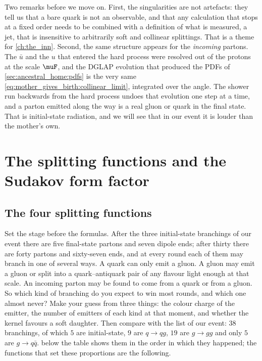 Two remarks before we move on. First, the singularities are not artefacts:
they tell us that a bare quark is not an observable, and that any
calculation that stops at a fixed order needs to be combined with a
definition of what is measured, a jet, that is insensitive to arbitrarily
soft and collinear splittings. That is a theme for \cref{ch:the_inn}.
Second, the same structure appears for the \emph{incoming} partons. The
$\bar u$ and the $u$ that entered the hard process were resolved out of the
protons at the scale $\muF$, and the DGLAP evolution that produced the PDFs
of \cref{sec:ancestral_home:pdfs} is the very same
\cref{eq:mother_gives_birth:collinear_limit}, integrated over the angle. The
shower run backwards from the hard process undoes that evolution one step
at a time, and a parton emitted along the way is a real gluon or quark in
the final state. That is initial-state radiation, and we will see that in
our event it is louder than the mother's own.

\section{The splitting functions and the Sudakov form factor}
\label{sec:mother_gives_birth:splitting_sudakov}

\subsection{The four splitting functions}
\label{sec:mother_gives_birth:splitting_functions}

Set the stage before the formulas. After the three initial-state branchings
of our event there are five final-state partons and seven dipole ends;
after thirty there are forty partons and sixty-seven ends, and at every
round each of them may branch in one of several ways. A quark can only emit
a gluon. A gluon may emit a gluon or split into a quark--antiquark pair of
any flavour light enough at that scale. An incoming parton may be found to
come from a quark or from a gluon. So which kind of branching do you expect
to win most rounds, and which one almost never? Make your guess from three
things: the colour charge of the emitter, the number of emitters of each
kind at that moment, and whether the kernel favours a soft daughter. Then
compare with the list of our event: $38$ branchings, of which $5$ are
initial-state, $9$ are $q\to qg$, $19$ are $g\to gg$ and only $5$ are
$g\to q\bar q$.  below the table shows
them in the order in which they happened; the functions that set these
proportions are the following.


